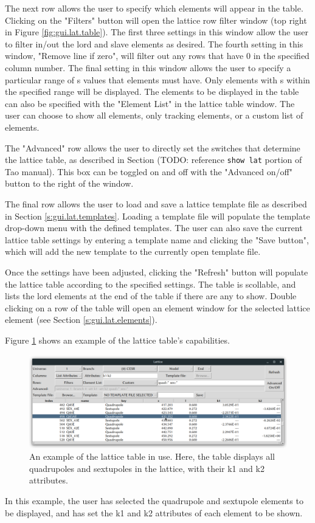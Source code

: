 The next row allows the user to specify which elements will appear in the table.
Clicking on the "Filters" button will open the lattice row filter window (top right in Figure \ref{fig:gui.lat.table}).
The first three settings in this window allow the user to filter in/out the lord and slave elements as desired.
The fourth setting in this window, "Remove line if zero", will filter out any rows that have $0$ in the specified column number.
The final setting in this window allows the user to specify a particular range of s values that elements must have.
Only elements with s within the specified range will be displayed.
The elements to be displayed in the table can also be specified with the "Element List" in the lattice table window.
The user can choose to show all elements, only tracking elements, or a custom list of elements.

The "Advanced" row allows the user to directly set the switches that determine the lattice table, as described in Section (TODO: reference \texttt{show lat} portion of Tao manual).
This box can be toggled on and off with the "Advanced on/off" button to the right of the window.

The final row allows the user to load and save a lattice template file as described in Section \ref{s:gui.lat.templates}.
Loading a template file will populate the template drop-down menu with the defined templates.
The user can also save the current lattice table settings by entering a template name and clicking the "Save button", which will add the new template to the currently open template file.

Once the settings have been adjusted, clicking the "Refresh" button will populate the lattice table according to the specified settings.
The table is scollable, and lists the lord elements at the end of the table if there are any to show.
Double clicking on a row of the table will open an element window for the selected lattice element (see Section \ref{s:gui.lat.elements}).

Figure \ref{fig:gui.lat.table.example} shows an example of the lattice table's capabilities.
\begin{figure}
\centering
\includegraphics[width=12cm]{figures/lat_table_example.pdf}
\caption[An example of the lattice table in use.]{An example of the lattice table in use.
Here, the table displays all quadrupoles and sextupoles in the lattice, with their k1 and k2 attributes.}
\label{fig:gui.lat.table.example}
\end{figure}
In this example, the user has selected the quadrupole and sextupole elements to be displayed, and has set the k1 and k2 attributes of each element to be shown.

